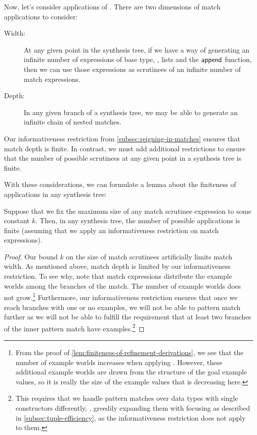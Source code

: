 Now, let's consider applications of .
There are two dimensions of match applications to consider:
\begin{description}
  \item[Width:] At any given point in the synthesis tree, if we have a way of generating an infinite number of expressions of base type, \eg, lists and the $\mathsf{append}$ function, then we can use those expressions as scrutinees of an infinite number of match expressions.
  \item[Depth:] In any given branch of a synthesis tree, we may be able to generate an infinite chain of nested matches.
\end{description}
Our informativeness restriction from \autoref{subsec:reigning-in-matches} ensures that match depth is finite.
In contrast, we must add additional restrictions to ensure that the number of possible scrutinees at any given point in a synthesis tree is finite.

With these considerations, we can formulate a lemma about the finiteness of  applications in any synthesis tree:

\begin{proofenv}
  \begin{lemma}
    Suppose that we fix the maximum size of any match scrutinee expression to some constant $k$.  Then, in any synthesis tree, the number of possible  applications is finite (assuming that we apply an informativeness restriction on match expressions).
    \label{lem:finiteness-of-match-derivations}
  \end{lemma}
  \begin{proof}
    Our bound $k$ on the size of match scrutinees artificially limits match width.
    As mentioned above, match depth is limited by our informativeness restriction.
    To see why, note that match expressions distribute the example worlds among the branches of the match.
    The number of example worlds does not grow.\footnote{%
      From the proof of \ref{lem:finiteness-of-refinement-derivations}, we see that the number of example worlds increases when applying .
      However, these additional example worlds are drawn from the structure of the goal example values, so it is really the size of the example values that is decreasing here.
    }
    Furthermore, our informativeness restriction ensures that once we reach branches with one or no examples, we will not be able to pattern match further as we will not be able to fulfill the requirement that at least two branches of the inner pattern match have examples.\footnote{%
      This requires that we handle pattern matches over data types with single constructors differently, \eg, greedily expanding them with focusing as described in \autoref{subsec:tuple-efficiency}, as the informativeness restriction does not apply to them.
    }
  \end{proof}
\end{proofenv}

